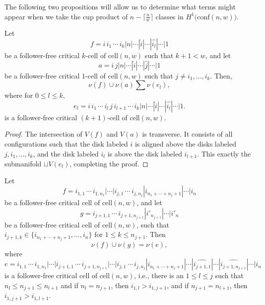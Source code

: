 The following two propositions will allow us to determine what terms might appear when we take the cup product of $n-\big\lceil\frac{n}{w}\big\rceil$ classes in $H^{1}\big(\text{conf}(n,w)\big)$.

\begin{prop}\label{product of critical cells with same first element is a sum of critical cells with the same first element}
Let
\[
f=i\, i_{1}\, \cdots\, i_{k}|n|\cdots|\widehat{i}|\cdots|\widehat{i_{l}}|\cdots|1
\]
be a follower-free critical $k$-cell of $\text{cell}(n,w)$ such that $k+1<w$, and let
\[
a=i\, j|n|\cdots|\widehat{i}|\cdots|\widehat{j}|\cdots|1
\]
be a follower-free critical $1$-cell of $\text{cell}(n,w)$ such that $j\neq i_{1},\dots, i_{k}$.
Then,
\[
\nu(f)\cup\nu(a)\sum\nu(e_{l}),
\]
where for $0\le l\le k$,
\[
e_{l}=i\, i_{1}\, \cdots\,i_{l}\, j\, i_{l+1}\, \cdots\,  i_{k}|n|\cdots|\widehat{i}|\cdots|\widehat{i_{l}}|\cdots|1.
\]
is a follower-free critical $(k+1)$-cell of $\text{cell}(n,w)$.
\end{prop}

\begin{proof}
The intersection of $V(f)$ and $V(a)$ is transverse.
It consists of all configurations such that the disk labeled $i$ is aligned above the disks labeled $j, i_{1},\dots, i_{k}$, and the disk labeled $i_{l}$ is above the disk labeled $i_{l+1}$. 
This exactly the submanifold $\sqcup V(e_{l})$, completing the proof.
\end{proof}

\begin{prop}\label{product of disjoint critical cells}
Let
\[
f=i_{1,1}\, \cdots\, i_{1, n_{1}}|\cdots|i_{j, 1}\, \cdots\, i_{j, n_{j}}|i_{n_{1}+\cdots+n_{j}+1}|\cdots|i_{n}
\]
be a follower-free critical cell of $\text{cell}(n,w)$,
and let
\[
g=i_{j+1, 1}\, \cdots\, i_{j+1, n_{j+1}}|i'_{n_{j+1}}|\cdots|i'_{n}
\]
be a follower-free critical cell of $\text{cell}(n,w)$, such that $i_{j+1, k}\in \{i_{n_{1}+\cdots+n_{j}+1},\dots,i_{n}\}$ for $1\le k\le n_{j+1}$.
Then
\[
\nu(f)\cup \nu(g)=\nu(e),
\]
where
\[
e=i_{1,1}\, \cdots\, i_{1, n_{1}}|\cdots|i_{j+1, 1}\, \cdots\, i_{j+1, n_{j+1}}|\cdots|i_{j, 1}\, \cdots\, i_{j, n_{j}}|i_{n_{1}+\cdots+n_{j}+1}|\cdots|\widehat{i_{j+1, 1}}|\cdots|\widehat{i_{j+1, n_{j+1}}}|\cdots|i_{n}
\]
is a follower-free critical cell of $\text{cell}(n,w)$, i.e., there is an $1\le l\le j$ such that $n_{l}\le n_{j+1}\le n_{l+1}$ and if $n_{l}=n_{j+1}$, then $i_{1, l}>i_{1,j+1}$, and if $n_{j+1}=n_{l+1}$, then $i_{1, j+1}>i_{1,l+1}$.
\end{prop}

